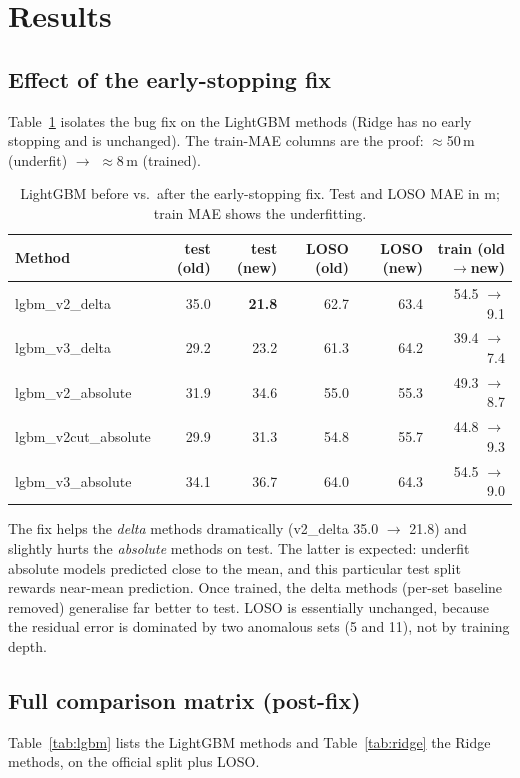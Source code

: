 \documentclass[11pt,a4paper]{article}
\newcommand{\um}{\,\textmu m}
\begin{document}
\section{Results}
\label{sec:results}

\subsection{Effect of the early-stopping fix}
Table~\ref{tab:beforeafter} isolates the bug fix on the LightGBM methods (Ridge
has no early stopping and is unchanged). The train-MAE columns are the proof:
$\approx$50\um{} (underfit) $\to$ $\approx$8\um{} (trained).

\begin{table}[h]
\centering
\caption{LightGBM before vs.\ after the early-stopping fix.
Test and LOSO MAE in \textmu m; train MAE shows the underfitting.}
\label{tab:beforeafter}
\small
\begin{tabular}{lrrrrr}
\toprule
Method               & test (old) & test (new) & LOSO (old) & LOSO (new) & train (old$\to$new) \\
\midrule
lgbm\_v2\_delta      & 35.0 & \textbf{21.8} & 62.7 & 63.4 & 54.5 $\to$ 9.1 \\
lgbm\_v3\_delta      & 29.2 & 23.2          & 61.3 & 64.2 & 39.4 $\to$ 7.4 \\
lgbm\_v2\_absolute   & 31.9 & 34.6          & 55.0 & 55.3 & 49.3 $\to$ 8.7 \\
lgbm\_v2cut\_absolute& 29.9 & 31.3          & 54.8 & 55.7 & 44.8 $\to$ 9.3 \\
lgbm\_v3\_absolute   & 34.1 & 36.7          & 64.0 & 64.3 & 54.5 $\to$ 9.0 \\
\bottomrule
\end{tabular}
\end{table}

\noindent
The fix helps the \emph{delta} methods dramatically (v2\_delta 35.0 $\to$ 21.8)
and slightly hurts the \emph{absolute} methods on test. The latter is expected:
underfit absolute models predicted close to the mean, and this particular test
split rewards near-mean prediction. Once trained, the delta methods (per-set
baseline removed) generalise far better to test. LOSO is essentially unchanged,
because the residual error is dominated by two anomalous sets (5 and 11), not
by training depth.

\subsection{Full comparison matrix (post-fix)}
Table~\ref{tab:lgbm} lists the LightGBM methods and Table~\ref{tab:ridge} the
Ridge methods, on the official split plus LOSO.
\end{document}
